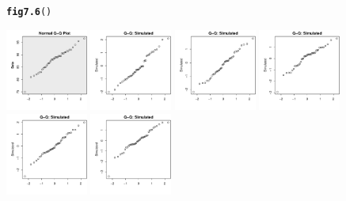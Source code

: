 \documentclass[12pt, a4paper,  BCOR=8.25mm, DIV=15]{scrartcl}\usepackage[]{graphicx}\usepackage[]{color}
\makeatletter
\newcommand{\hlstd}[1]{\textcolor[rgb]{0.345,0.345,0.345}{#1}}%
\newcommand{\hlkwd}[1]{\textcolor[rgb]{0.737,0.353,0.396}{\textbf{#1}}}%
\newenvironment{kframe}{%
 \def\at@end@of@kframe{}%
 \ifinner\ifhmode%
  \def\at@end@of@kframe{\end{minipage}}%
  \begin{minipage}{\columnwidth}%
 \fi\fi%
 \def\FrameCommand##1{\hskip\@totalleftmargin \hskip-\fboxsep
 \colorbox{shadecolor}{##1}\hskip-\fboxsep
     \hskip-\linewidth \hskip-\@totalleftmargin \hskip\columnwidth}%
 \MakeFramed {\advance\hsize-\width
   \@totalleftmargin\z@ \linewidth\hsize
   \@setminipage}}%
 {\par\unskip\endMakeFramed%
 \at@end@of@kframe}
\newenvironment{knitrout}{}{} %
\makeatother
\begin{document}
\begin{figure}[ht]
\begin{knitrout}
\color{fgcolor}\begin{kframe}
\begin{alltt}
\hlkwd{fig7.6}\hlstd{()}
\end{alltt}
\end{kframe}

{\centering \includegraphics[width=0.24\textwidth]{figure/gph-fig7_6e-1} 
\includegraphics[width=0.24\textwidth]{figure/gph-fig7_6e-2} 
\includegraphics[width=0.24\textwidth]{figure/gph-fig7_6e-3} 
\includegraphics[width=0.24\textwidth]{figure/gph-fig7_6e-4} 
\includegraphics[width=0.24\textwidth]{figure/gph-fig7_6e-5} 
\includegraphics[width=0.24\textwidth]{figure/gph-fig7_6e-6} 
}
\end{knitrout}
\end{figure}
\end{document}
